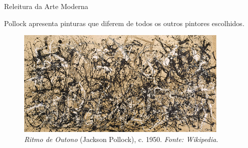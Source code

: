 \documentclass{beamer}
\begin{document}
\begin{frame}{Releitura da Arte Moderna}

  Pollock apresenta pinturas que diferem de todos os outros
  pintores escolhidos.

  \begin{figure}[h!]
  \begin{center}
  \includegraphics[width=0.9\textwidth]{figs/pollock_ritmo.png}
  \caption{\emph{Ritmo de Outono} (Jackson Pollock), c. 1950. \textit{Fonte: Wikipedia}.}
  \label{fig:pollock:ritmo}
  \end{center}
\end{figure}

\end{frame}
\end{document}

